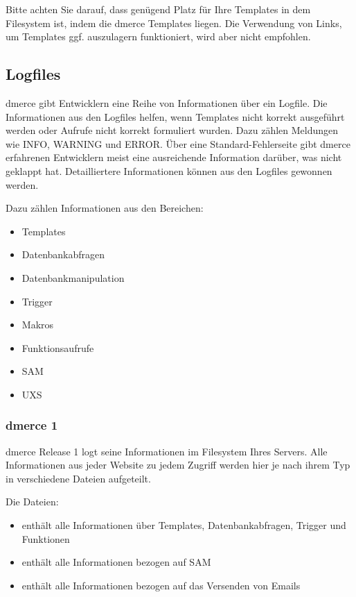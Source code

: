 Bitte achten Sie darauf, dass gen\"ugend Platz f\"ur Ihre Templates in
dem Filesystem ist, indem die dmerce Templates liegen. Die Verwendung
von Links, um Templates ggf. auszulagern funktioniert, wird aber nicht
empfohlen.

\subsection{Logfiles}

dmerce gibt Entwicklern eine Reihe von Informationen \"uber ein
Logfile. Die Informationen aus den Logfiles helfen, wenn Templates
nicht korrekt ausgef\"uhrt werden oder Aufrufe nicht korrekt
formuliert wurden. Dazu z\"ahlen Meldungen wie INFO, WARNING und
ERROR. \"Uber eine Standard-Fehlerseite gibt dmerce erfahrenen
Entwicklern meist eine ausreichende Information dar\"uber, was nicht
geklappt hat. Detailliertere Informationen k\"onnen aus den Logfiles
gewonnen werden.

Dazu z\"ahlen Informationen aus den Bereichen:

\begin{itemize}
\item Templates
\item Datenbankabfragen
\item Datenbankmanipulation
\item Trigger
\item Makros
\item Funktionsaufrufe
\item SAM
\item UXS
\end{itemize}

\subsubsection{dmerce 1}

dmerce Release 1 logt seine Informationen im Filesystem
 Ihres Servers. Alle Informationen aus jeder Website
zu jedem Zugriff werden hier je nach ihrem Typ in verschiedene Dateien
aufgeteilt.

Die Dateien:

\begin{itemize}
\item {} enth\"alt alle Informationen
  \"uber Templates, Datenbankabfragen, Trigger und Funktionen
\item {} enth\"alt alle Informationen bezogen
  auf SAM
\item {} enth\"alt alle Informationen bezogen
  auf das Versenden von Emails
\end{itemize}


